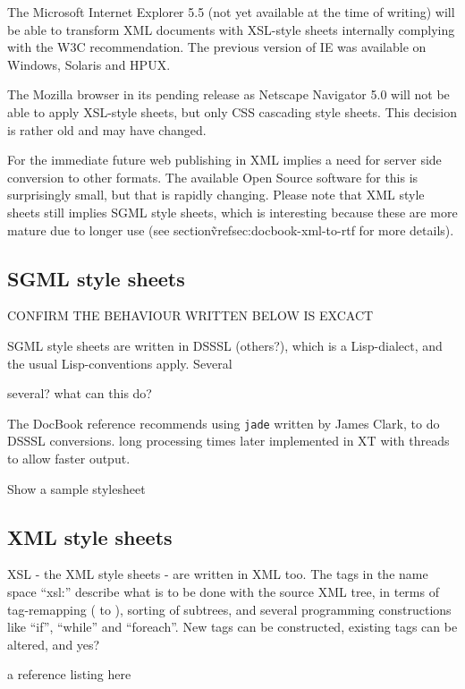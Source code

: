 The Microsoft Internet Explorer 5.5 (not yet available at the time of
writing) will be able to transform XML documents with XSL-style sheets
internally complying with the W3C recommendation.  The previous
version of IE was available on Windows, Solaris and HPUX.

The Mozilla browser in its pending release as Netscape Navigator 5.0
will not be able to apply XSL-style sheets, but only CSS cascading
style sheets.  This \textsf{decision is rather old and may have
  changed}. 

For the immediate future web publishing in XML implies a need for
server side conversion to other formats.  The available Open Source
software for this is surprisingly small, but that is rapidly
changing.  Please note that XML style sheets still implies SGML style
sheets, which is interesting because these are more mature due to
longer use (see section\~vref{sec:docbook-xml-to-rtf} for more
details). 


\subsection{SGML style sheets}

\textsf{CONFIRM THE BEHAVIOUR WRITTEN BELOW IS EXCACT}

SGML style sheets are \textsf{written in DSSSL} (others?), which is
a Lisp-dialect, and the usual Lisp-conventions apply.  Several

\textsf{several?} \textsf{what can this do?}

The DocBook reference recommends using \texttt{jade} written by James
Clark, to do DSSSL conversions.  \textsf{long processing times later
  implemented in XT with threads to allow faster output}.  

\textsf{Show a sample stylesheet}

\subsection{XML style sheets}

XSL - the XML style sheets - are written in XML too.  The tags in the
name space ``xsl:'' describe what is to be done with the source XML
tree, in terms of tag-remapping ( to ), sorting
of subtrees, and several programming constructions like ``if'',
``while'' and ``foreach''.  New tags can be constructed, existing tags
can be altered, and \textsf{yes?}

\textsf{a reference listing here}

